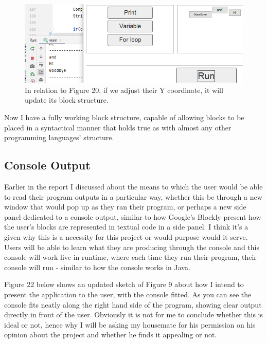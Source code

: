 \documentclass[a4paper, 12pt]{article}
\begin{document}
            \begin{figure}[h]
                \centering
                \includegraphics[width=120mm]{blockstructure4.png}
                \caption{In relation to Figure 20, if we adjust their Y coordinate, it will update
                its block structure.}
            \end{figure}
            
            Now I have a fully working block structure, capable of allowing blocks to be placed in a
            syntactical manner that holds true as with almost any other programming languages' structure.

        \clearpage
        \subsection{Console Output}
            Earlier in the report I discussed about the means to which the user would be able to 
            read their program outputs in a particular way, whether this be through a new window
            that would pop up as they ran their program, or perhaps a new side panel dedicated to
            a console output, similar to how Google's Blockly present how the user's blocks are
            represented in textual code in a side panel. I think it's a given why this is a necessity
            for this project or would purpose would it serve. Users will be able to learn what they
            are producing through the console and this console will work live in runtime, where each
            time they run their program, their console will run - similar to how the console works
            in Java.

            Figure 22 below shows an updated sketch of Figure 9 about how I intend to present the
            application to the user, with the console fitted. As you can see the console fits neatly
            along the right hand side of the program, showing clear output directly in front of
            the user. Obviously it is not for me to conclude whether this is ideal or not, hence why
            I will be asking my housemate for his permission on his opinion about the project and
            whether he finds it appealing or not.
\end{document}
